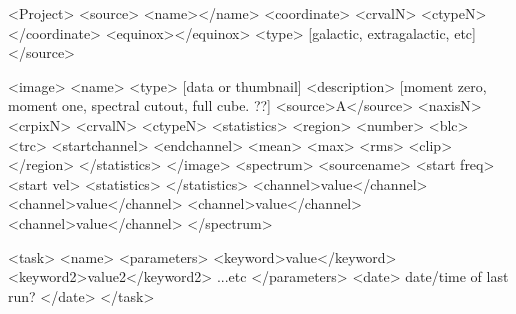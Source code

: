 \documentclass{report}
\begin{document}
<Project>
<source>
    <name></name>
    <coordinate>
        <crvalN>
        <ctypeN>
    </coordinate>
    <equinox></equinox>
    <type> [galactic, extragalactic, etc]
</source>

<image>
   <name>
   <type> [data or thumbnail]
   <description> [moment zero, moment one, spectral cutout, full cube. ??] 
   <source>A</source> %
   <naxisN>
   <crpixN>
   <crvalN>
   <ctypeN>
   <statistics>
        <region>
            <number>
            <blc>
            <trc>
            <startchannel>
            <endchannel>
            <mean>
            <max>
            <rms>
            <clip>
        </region>
   </statistics>
</image>
<spectrum>
   <sourcename>
   <start freq>
   <start vel>
   <statistics> </statistics> %
   <channel>value</channel>
   <channel>value</channel>
   <channel>value</channel>
   <channel>value</channel> 
</spectrum>

<task>
  <name>
  <parameters>
    <keyword>value</keyword>
    <keyword2>value2</keyword2>
    ...etc
  </parameters>
  <date> date/time of last run? </date>
</task>
\end{document}

